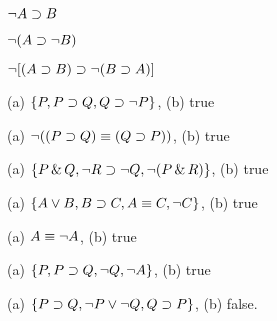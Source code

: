 \begin{earg}
\item %
$\neg A \supset B$
\item %
$\neg(A \supset \neg B)$
\item %
$\neg [(A\supset B) \supset \neg(B\supset A)]$
\end{earg}




\begin{earg}
\item (a) $\{P, P \supset Q, Q \supset \neg P\}$, (b) true
\item (a) $\neg((P \supset Q) \equiv (Q \supset P))$, (b) true
\item (a) $\{P \,\&\, Q, \neg R \supset \neg Q, \neg (P \,\&\, R)\}$, (b) true
\item (a) $\{A \vee B, B \supset C, A \equiv C, \neg C\}$, (b) true
\item (a) $A \equiv \neg A$, (b) true
\item (a) $\{P, P \supset Q, \neg Q, \neg A\}$, (b) true
\item (a) $\{P \supset Q, \neg P \vee \neg Q, Q \supset P\}$, (b) false.
\end{earg}

